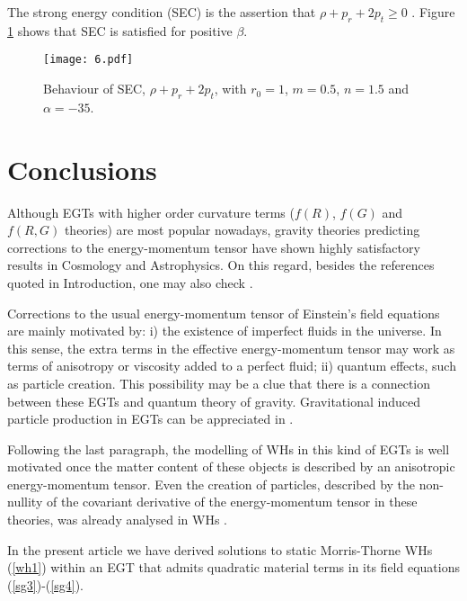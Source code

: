 \documentclass[twocolumn,showpacs,aps,amssymb,floatfix,prd,amsmath,preprintnumbers]{revtex4}
\begin{document}
The strong energy condition (SEC) is the assertion that $\rho+p_r+2p_t\geq0$ \cite{visser/1995}. Figure \ref{fig11} shows that SEC is satisfied for positive $\beta$.

\begin{figure}[h!]
\centering
\texttt{[image: 6.pdf]}
\caption{Behaviour of SEC, $\rho+p_r+2p_t$, with $r_0=1$, $m=0.5$, $n=1.5$ and $\alpha=-35$.}\label{fig11}
\end{figure}


\section{Conclusions}\label{sec:c}

Although EGTs with higher order curvature terms ($f(R)$, $f(G)$ and $f(R,G)$ theories) are most popular nowadays, gravity theories predicting corrections to the energy-momentum tensor have shown highly satisfactory results in Cosmology and Astrophysics. On this regard, besides the references quoted in Introduction, one may also check \cite{azevedo/2016}.

Corrections to the usual energy-momentum tensor of Einstein's field equations are mainly motivated by: i) the existence of imperfect fluids in the universe. In this sense, the extra terms in the effective energy-momentum tensor may work as terms of anisotropy or viscosity added to a perfect fluid; ii) quantum effects, such as particle creation. This possibility may be a clue that there is a connection between these EGTs and quantum theory of gravity. Gravitational induced particle production in  EGTs can be appreciated in \cite{harko/2015}.

Following the last paragraph, the modelling of WHs in this kind of EGTs is well motivated once the matter content of these objects is described by an anisotropic energy-momentum tensor. Even the creation of particles, described by the non-nullity of the covariant derivative of the energy-momentum tensor in these theories, was already analysed in WHs \cite{pan/2015,kim/1992}.

In the present article we have derived solutions to static Morris-Thorne WHs (\ref{wh1}) within an EGT that admits quadratic material terms in its field equations (\ref{sg3})-(\ref{sg4}). 
\end{document}
